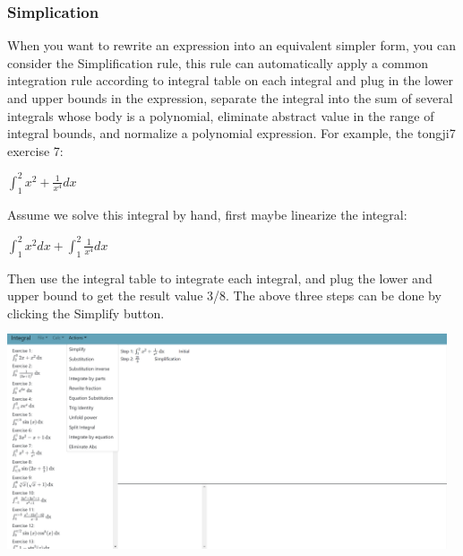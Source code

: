 \documentclass[titlepage]{article}
\begin{document}
\subsubsection{Simplication}
When you want to rewrite an expression into an equivalent simpler form, you can consider the Simplification rule, this rule can automatically apply a common integration rule according to integral table on each integral and plug in the lower and upper bounds in the expression, separate the integral into the sum of several integrals whose body is a polynomial, eliminate abstract value in the range of integral bounds, and normalize a polynomial expression. For example, the tongji7 exercise 7:
\begin{center}
$\int_{1}^{2} x^2 + \frac{1}{x^4} dx$
\end{center}
Assume we solve this integral by hand, first maybe linearize the integral:
\begin{center}
$\int_{1}^{2} x^2 dx + \int_{1}^{2} \frac{1}{x^4} dx$
\end{center}
Then use the integral table to integrate each integral, and plug the lower and upper bound to get the result value 3/8. The above three steps can be done by clicking the \colorbox{mygray}{Simplify} button.\\
\includegraphics[width=13cm, height=7cm]{8.png}
\end{document}
